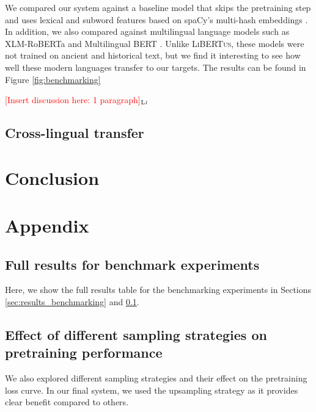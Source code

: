 \documentclass[11pt]{article}
\newcommand{\draftonly}[1]{#1}
\newcommand{\draftcomment}[3]{\draftonly{\textcolor{#2}{[#3]{$_{\textsc{#1}}$}}}}
\newcommand{\lj}[1]{\draftcomment{Lj}{red}{#1}}
\newcommand{\libertus}{\textsc{LiBERTus}}
\begin{document}
We compared our system against a baseline model that skips the pretraining step
and uses lexical and subword features based on spaCy's multi-hash embeddings \cite{miranda-etal-2022-multi}.
In addition, we also compared against multilingual language models such as XLM-RoBERTa \cite{conneau-etal-2020-unsupervised} and Multilingual BERT \cite{devlin-etal-2019-bert}.
Unlike \libertus{}, these models were not trained on ancient and historical text, but we find it interesting to see how well these modern languages transfer to our targets. 
The results can be found in Figure \ref{fig:benchmarking}

\lj{Insert discussion here: 1 paragraph}

\subsection{Cross-lingual transfer}
\label{sec:results_crosslingual}


\section{Conclusion}




\appendix

\section{Appendix}
\label{sec:appendix}

\subsection{Full results for benchmark experiments}

Here, we show the full results table for the benchmarking experiments in Sections \ref{sec:results_benchmarking} and \ref{sec:results_crosslingual}.

\subsection{Effect of different sampling strategies on pretraining performance}

We also explored different sampling strategies and their effect on the pretraining loss curve.
In our final system, we used the upsampling strategy as it provides clear benefit compared to others.
\end{document}
